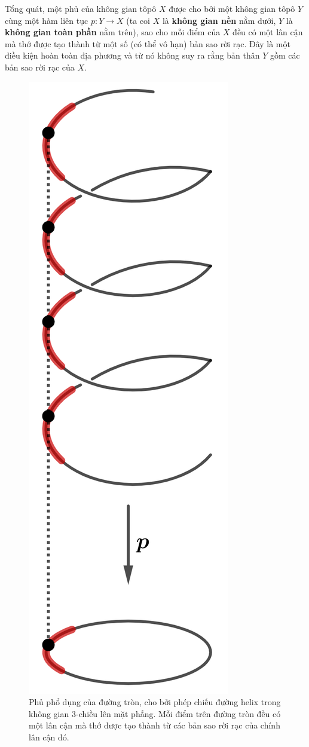 \documentclass[12pt]{article}
\begin{document}
Tổng quát, một phủ của không gian tôpô $X$ được cho bởi một không gian tôpô $Y$ cùng một hàm liên tục $p: Y \to X$ (ta coi $X$ là {\bf không gian nền} nằm dưới, $Y$ là {\bf không gian toàn phần} nằm trên), sao cho mỗi điểm của $X$ đều có một lân cận mà thớ được tạo thành từ một số (có thể vô hạn) bản sao rời rạc. Đây là một điều kiện hoàn toàn địa phương và từ nó không suy ra rằng bản thân $Y$ gồm các bản sao rời rạc của $X$.

\begin{figure}[h!]
    \centering
    \includegraphics[scale = .2]{h8.png}
    \caption{Phủ phổ dụng của đường tròn, cho bởi phép chiếu đường helix trong không gian $3$-chiều lên mặt phẳng. Mỗi điểm trên đường tròn đều có một lân cận mà thớ được tạo thành từ các bản sao rời rạc của chính lân cận đó.}
    \label{h8}
\end{figure}
\end{document}
